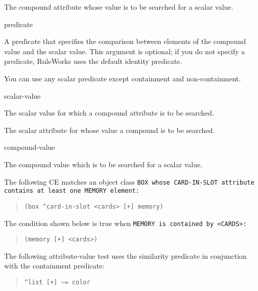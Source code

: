 \begin{operands}
\item[\ct{compound-attr}]

  The compound attribute whose value is to be searched for a scalar
  value.

\item[predicate]

  A predicate that specifies the comparison between elements of the
  compound value and the scalar value. This argument is optional; if
  you do not specify a predicate, RuleWorks uses the default identity
  predicate.

  You can use any scalar predicate except containment and
  non-containment.

\item[scalar-value]

  The scalar value for which a compound attribute is to be searched.

\item[\ct{scalar-attr}]

  The scalar attribute for whose value a compound is to be searched.

\item[compound-value]

  The compound value which is to be searched for a scalar value.
\end{operands}

\Example

The following CE matches an object class \tt{BOX} whose
\ct\tt{CARD-IN-SLOT} attribute contains at least one \tt{MEMORY} element:

\begin{quote}
\begin{verbatim}
(box ^card-in-slot <cards> [+] memory)
\end{verbatim}
\end{quote}

The condition shown below is true when \tt{MEMORY} is contained by
\tt{<CARDS>}:

\begin{quote}
\begin{verbatim}
(memory [+] <cards>)
\end{verbatim}
\end{quote}

The following attribute-value test uses the similarity
predicate in conjunction with the containment predicate:

\begin{quote}
\begin{verbatim}
^list [+] ~= color
\end{verbatim}
\end{quote}

